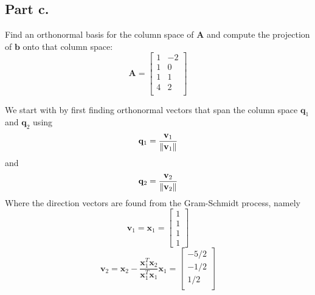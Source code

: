 \subsection{Part c.}
Find an orthonormal basis for the column space of $\mathbf{A}$ and compute
the projection of $\mathbf{b}$ onto that column space:
\begin{equation}
    \mathbf{A} =
    \begin{bmatrix}
        1       &       -2  \\
        1       &       0   \\
        1       &       1   \\
        4       &       2   \\
    \end{bmatrix}
\end{equation}
\begin{mdframed}[style=MyFrame]
    We start with by first finding orthonormal vectors that span the column
    space $\mathbf{q}_{1}$ and $\mathbf{q}_{2}$ using
    \begin{equation}
        \mathbf{q}_{1} =
            \frac{\mathbf{v}_{1}}{\norm{\mathbf{v}_{1}}}
    \end{equation}
    and 
    \begin{equation}
        \mathbf{q}_{2} =
            \frac{\mathbf{v}_{2}}{\norm{\mathbf{v}_{2}}}
    \end{equation}
    Where the direction vectors are found from the Gram-Schmidt process, namely
    \begin{equation}
        \mathbf{v}_{1} = \mathbf{x}_{1} = 
        \begin{bmatrix}
            1       \\
            1       \\
            1       \\
            1
        \end{bmatrix}
    \end{equation}
    \begin{equation}
        \mathbf{v}_{2} = 
                \mathbf{x}_{2} 
                - \frac{\mathbf{x}_{1}^{T}\mathbf{x}_{2}}
                {\mathbf{x}_{1}^{T} \mathbf{x}_{1}}
                \mathbf{x}_{1}
                =
                \begin{bmatrix}
                    -5/2        \\
                    -1/2        \\
                    1/2         \\

\end{bmatrix}
\end{equation}
\end{mdframed}
